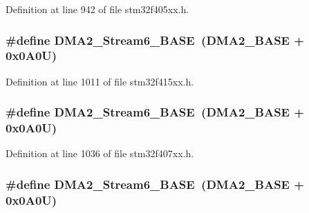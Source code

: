 Definition at line 942 of file stm32f405xx.\+h.

\subsubsection[{\texorpdfstring{D\+M\+A2\+\_\+\+Stream6\+\_\+\+B\+A\+SE}{DMA2_Stream6_BASE}}]{\setlength{\rightskip}{0pt plus 5cm}\#define D\+M\+A2\+\_\+\+Stream6\+\_\+\+B\+A\+SE~({\bf D\+M\+A2\+\_\+\+B\+A\+SE} + 0x0\+A0\+U)}\hypertarget{group___peripheral__registers__structures_ga5e81174c96fd204fa7c82c815e85c8e6}{}\label{group___peripheral__registers__structures_ga5e81174c96fd204fa7c82c815e85c8e6}


Definition at line 1011 of file stm32f415xx.\+h.

\subsubsection[{\texorpdfstring{D\+M\+A2\+\_\+\+Stream6\+\_\+\+B\+A\+SE}{DMA2_Stream6_BASE}}]{\setlength{\rightskip}{0pt plus 5cm}\#define D\+M\+A2\+\_\+\+Stream6\+\_\+\+B\+A\+SE~({\bf D\+M\+A2\+\_\+\+B\+A\+SE} + 0x0\+A0\+U)}\hypertarget{group___peripheral__registers__structures_ga5e81174c96fd204fa7c82c815e85c8e6}{}\label{group___peripheral__registers__structures_ga5e81174c96fd204fa7c82c815e85c8e6}


Definition at line 1036 of file stm32f407xx.\+h.

\subsubsection[{\texorpdfstring{D\+M\+A2\+\_\+\+Stream6\+\_\+\+B\+A\+SE}{DMA2_Stream6_BASE}}]{\setlength{\rightskip}{0pt plus 5cm}\#define D\+M\+A2\+\_\+\+Stream6\+\_\+\+B\+A\+SE~({\bf D\+M\+A2\+\_\+\+B\+A\+SE} + 0x0\+A0\+U)}\hypertarget{group___peripheral__registers__structures_ga5e81174c96fd204fa7c82c815e85c8e6}{}\label{group___peripheral__registers__structures_ga5e81174c96fd204fa7c82c815e85c8e6}


